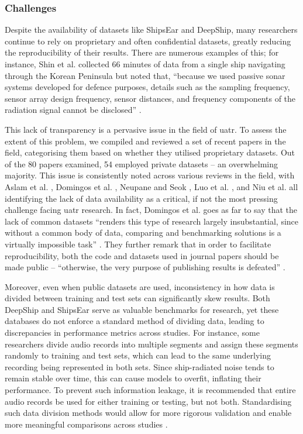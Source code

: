 \subsubsection{Challenges}\label{subsubsec:data-challenges}

Despite the availability of datasets like ShipsEar and DeepShip, many researchers continue to rely on proprietary and often confidential datasets, greatly reducing the reproducibility of their results. There are numerous examples of this; for instance, Shin et al. collected 66 minutes of data from a single ship navigating through the Korean Peninsula but noted that, ``because we used passive sonar systems developed for defence purposes, details such as the sampling frequency, sensor array design frequency, sensor distances, and frequency components of the radiation signal cannot be disclosed'' \cite[8]{shin_passive_2022}. 

This lack of transparency is a pervasive issue in the field of \acrshort{uatr}. To assess the extent of this problem, we compiled and reviewed a set of recent papers in the field, categorising them based on whether they utilised proprietary datasets. Out of the 80 papers examined, 54 employed private datasets -- an overwhelming majority. This issue is consistently noted across various reviews in the field, with Aslam et al. \cite[16]{aslam_underwater_2024}, Domingos et al. \cite[24]{domingos_survey_2022}, Neupane and Seok \cite[24]{neupane_review_2020}, Luo et al. \cite[12]{luo_survey_2023}, and Niu et al. \cite[19]{niu_advances_2023} all identifying the lack of data availability as a critical, if not the most pressing challenge facing \acrshort{uatr} research. In fact, Domingos et al. goes as far to say that the lack of common datasets ``renders this type of research largely insubstantial, since without a common body of data, comparing and benchmarking solutions is a virtually impossible task'' \cite[24]{domingos_survey_2022}. They further remark that in order to facilitate reproducibility, both the code and datasets used in journal papers should be made public -- ``otherwise, the very purpose of publishing results is defeated'' \cite[24]{domingos_survey_2022}.

Moreover, even when public datasets are used, inconsistency in how data is divided between training and test sets can significantly skew results. Both DeepShip and ShipsEar serve as valuable benchmarks for research, yet these databases do not enforce a standard method of dividing data, leading to discrepancies in performance metrics across studies. For instance, some researchers divide audio records into multiple segments and assign these segments randomly to training and test sets, which can lead to the same underlying recording being represented in both sets. Since ship-radiated noise tends to remain stable over time, this can cause models to overfit, inflating their performance. To prevent such information leakage, it is recommended that entire audio records be used for either training or testing, but not both. Standardising such data division methods would allow for more rigorous validation and enable more meaningful comparisons across studies \cite{niu_advances_2023}.